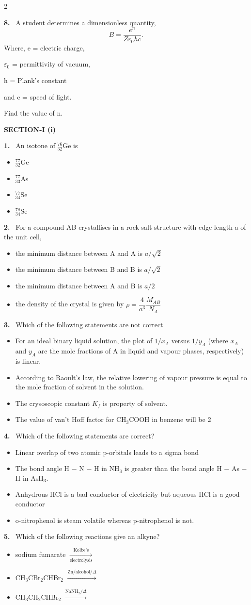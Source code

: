 \documentclass[10pt]{extarticle}
\newcommand{\partsec}[2]{\par\medskip\noindent{\large\bfseries PART-#1: #2}\par\smallskip}
\newcommand{\sect}[1]{\par\smallskip\noindent\textbf{#1}\par}
\newcommand{\qn}[1]{\par\smallskip\noindent\textbf{#1.}~}
\newenvironment{qoptions}{\begin{itemize}[leftmargin=1.8em,itemsep=1pt,topsep=2pt,label={}]}{\end{itemize}}
\newcommand{\opt}[2]{\item[(#1)] #2}
\begin{document}
\begin{multicols}{2}
\qn{8} A student determines a dimensionless quantity,
\[B=\dfrac{e^n}{Z\varepsilon_0hc}.\]
Where, e = electric charge,\par
$\varepsilon_0$ = permittivity of vacuum,\par
h = Plank's constant\par
and c = speed of light.\par
Find the value of n.
\partsec{2}{CHEMISTRY}
\sect{SECTION-I (i)}
\qn{1} An isotone of $^{76}_{32}$Ge is
\begin{qoptions}
\opt{A}{$^{77}_{32}$Ge}
\opt{B}{$^{77}_{33}$As}
\opt{C}{$^{77}_{34}$Se}
\opt{D}{$^{78}_{34}$Se}
\end{qoptions}
\qn{2} For a compound AB crystallises in a rock salt structure with edge length a of the unit cell,
\begin{qoptions}
\opt{A}{the minimum distance between A and A is $a/\sqrt2$}
\opt{B}{the minimum distance between B and B is $a/\sqrt2$}
\opt{C}{the minimum distance between A and B is $a/2$}
\opt{D}{the density of the crystal is given by $\rho=\dfrac{4}{a^3}\dfrac{M_{AB}}{N_A}$}
\end{qoptions}
\qn{3} Which of the following statements are not correct
\begin{qoptions}
\opt{A}{For an ideal binary liquid solution, the plot of $1/x_A$ versus $1/y_A$ (where $x_A$ and $y_A$ are the mole fractions of A in liquid and vapour phases, respectively) is linear.}
\opt{B}{According to Raoult's law, the relative lowering of vapour pressure is equal to the mole fraction of solvent in the solution.}
\opt{C}{The crysoscopic constant $K_f$ is property of solvent.}
\opt{D}{The value of van't Hoff factor for CH$_3$COOH in benzene will be 2}
\end{qoptions}
\qn{4} Which of the following statements are correct?
\begin{qoptions}
\opt{A}{Linear overlap of two atomic p-orbitals leads to a sigma bond}
\opt{B}{The bond angle H $-$ N $-$ H in NH$_3$ is greater than the bond angle H $-$ As $-$ H in AsH$_3$.}
\opt{C}{Anhydrous HCl is a bad conductor of electricity but aqueous HCl is a good conductor}
\opt{D}{o-nitrophenol is steam volatile whereas p-nitrophenol is not.}
\end{qoptions}
\qn{5} Which of the following reactions give an alkyne?
\begin{qoptions}
\opt{A}{sodium fumarate $\xrightarrow[\text{electrolysis}]{\text{Kolbe's}}$}
\opt{B}{CH$_3$CBr$_2$CHBr$_2$ $\xrightarrow{\text{Zn/alcohol}/\Delta}$}
\opt{C}{CH$_3$CH$_2$CHBr$_2$ $\xrightarrow{\text{NaNH}_2/\Delta}$}

\end{qoptions}
\end{multicols}
\end{document}
